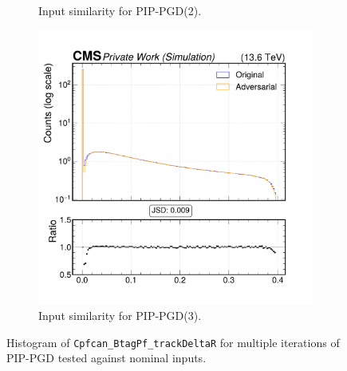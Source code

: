 \begin{figure}[htbp]
\begin{subfigure}[t]{0.32\textwidth}
    \caption*{Input similarity for PIP-PGD(2).}
  \end{subfigure}\hfill
  \begin{subfigure}[t]{0.32\textwidth}
    \includegraphics[width=\linewidth]{media/output/features/compare/combined_it_3/cmp_cpf_arr_Cpfcan_BtagPf_trackDeltaR.pdf}
    \caption*{Input similarity for PIP-PGD(3).}
  \end{subfigure}

  \caption*{Histogram of \texttt{Cpfcan\_BtagPf\_trackDeltaR} for multiple iterations of PIP-PGD tested against nominal inputs.}
  \label{fig:combined_input_Cpfcan_BtagPf_trackDeltaR}
\end{figure}

